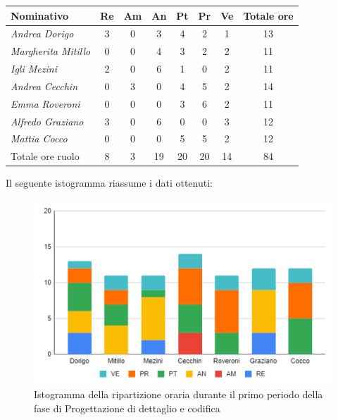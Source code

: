 {{{{{{{{	\begin{center}
		\renewcommand{\arraystretch}{1.4}
		\begin{tabularx}{\textwidth}{|X|c|c|c|c|c|c|c|}
			\hline
			\rowcolor{airforceblue}
			\textbf{Nominativo} & \textbf{Re} & \textbf{Am} & \textbf{An} & \textbf{Pt} & \textbf{Pr} & \textbf{Ve} & \textbf{Totale ore}\\
			\hline
			\textit{Andrea Dorigo} & 3 & 0 & 3 & 4 & 2 & 1 & 13\\
			\hline
			\textit{Margherita Mitillo} & 0 & 0 & 4 & 3 & 2 & 2 & 11\\
			\hline
			\textit{Igli Mezini} & 2 & 0 & 6 & 1 & 0 & 2 & 11\\
			\hline
			\textit{Andrea Cecchin} & 0 & 3 & 0 & 4 & 5 & 2 & 14\\
			\hline
			\textit{Emma Roveroni} & 0 & 0 & 0 & 3 & 6 & 2 & 11\\
			\hline
			\textit{Alfredo Graziano} & 3 & 0 & 6 & 0 & 0 & 3 & 12\\
			\hline
			\textit{Mattia Cocco} & 0 & 0 & 0 & 5 & 5 & 2 & 12\\
			\hline
			Totale ore ruolo & 8 & 3 & 19 & 20 & 20 & 14 & 84\\
			\hline
		\end{tabularx}
	\end{center}
Il seguente istogramma riassume i dati ottenuti:
\begin{figure}[!h]
	\begin{center}
		\includegraphics[width=0.7\linewidth]{../immagini/pdp/istogramma_progettazione_dettaglio_periodo1.png}
		\caption{Istogramma della ripartizione oraria durante il primo periodo della fase di Progettazione di
			dettaglio e codifica}
	\end{center}
\end{figure}
\clearpage
}}}}}}}}
